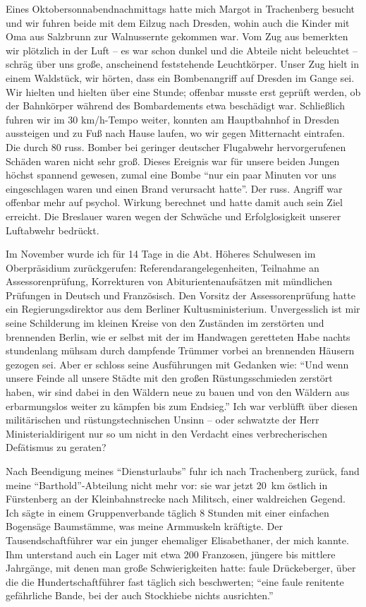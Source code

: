 Eines Oktobersonnabendnachmittags hatte mich Margot in Trachenberg besucht und wir  fuhren beide mit dem Eilzug nach Dresden, wohin auch die Kinder mit Oma aus Salzbrunn zur Walnussernte gekommen war. Vom Zug aus bemerkten wir plötzlich in der Luft -- es war schon dunkel und die Abteile nicht beleuchtet -- schräg über uns große, anscheinend feststehende Leuchtkörper. Unser Zug hielt in einem Waldstück, wir hörten, dass ein Bombenangriff auf Dresden im Gange sei. Wir hielten und hielten über eine Stunde; offenbar musste erst geprüft werden, ob der Bahnkörper während des Bombardements etwa beschädigt war. Schließlich fuhren wir im 30 km/h-Tempo weiter, konnten am Hauptbahnhof in Dresden aussteigen und zu Fuß nach Hause laufen, wo wir gegen Mitternacht eintrafen. Die durch 80 russ. Bomber bei geringer deutscher Flugabwehr hervorgerufenen Schäden waren nicht sehr groß. Dieses Ereignis war für unsere beiden Jungen höchst spannend gewesen, zumal eine Bombe \enquote{nur ein paar Minuten vor uns eingeschlagen waren und einen Brand verursacht hatte}. Der russ. Angriff war offenbar mehr auf psychol. Wirkung berechnet und hatte damit auch sein Ziel erreicht. Die Breslauer waren wegen der  Schwäche und Erfolglosigkeit unserer Luftabwehr bedrückt.

Im November wurde ich für 14 Tage in die Abt. Höheres Schulwesen im Oberpräsidium zurückgerufen: Referendarangelegenheiten, Teilnahme an Assessorenprüfung, Korrekturen von Abiturientenaufsätzen mit mündlichen Prüfungen in Deutsch und Französisch. Den Vorsitz der Assessorenprüfung hatte ein Regierungsdirektor aus dem Berliner Kultusministerium. Unvergesslich ist mir seine Schilderung im kleinen Kreise von den Zuständen im zerstörten und brennenden Berlin, wie er selbst mit der im Handwagen geretteten Habe nachts stundenlang mühsam durch dampfende Trümmer vorbei an brennenden Häusern gezogen sei. Aber er schloss seine Ausführungen mit Gedanken wie: \enquote{Und wenn unsere Feinde all unsere Städte mit den großen Rüstungsschmieden zerstört haben, wir sind dabei in den Wäldern neue zu bauen und von den Wäldern aus erbarmungslos weiter zu kämpfen bis zum Endsieg.} Ich war verblüfft über diesen militärischen und rüstungstechnischen Unsinn -- oder schwatzte der Herr Ministerialdirigent nur so um nicht in  den Verdacht eines verbrecherischen Defätismus zu geraten?

 Nach Beendigung meines \enquote{Diensturlaubs} fuhr ich nach Trachenberg zurück, fand meine \enquote{Barthold}-Abteilung nicht mehr vor: sie war jetzt 20~km östlich in Fürstenberg an der Kleinbahnstrecke nach Militsch, einer waldreichen Gegend. Ich sägte in einem Gruppenverbande täglich 8 Stunden mit einer einfachen Bogensäge Baumstämme, was meine Armmuskeln kräftigte. Der Tausendschaftführer war ein junger ehemaliger Elisabethaner, der mich kannte. Ihm unterstand auch ein Lager mit etwa 200 Franzosen, jüngere bis mittlere Jahrgänge, mit denen man große Schwierigkeiten hatte: faule Drückeberger, über die die Hundertschaftführer fast täglich sich beschwerten; \enquote{eine faule renitente gefährliche Bande, bei der auch Stockhiebe nichts ausrichten.}

